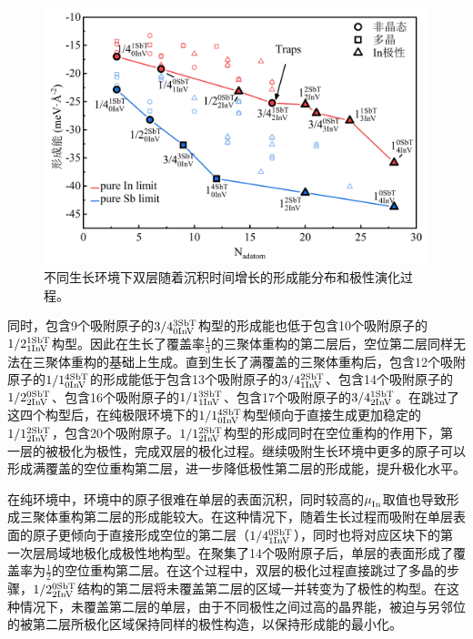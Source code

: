 \begin{figure}[htb]
    \includegraphics{pic/IS_DFT_2LInSb_partEnergy.png}
    \caption{不同生长环境下双层随着沉积时间增长的形成能分布和极性演化过程。}
    \label{fig:IS_DFT_2LInSb_partEnergy}
\end{figure}

同时，包含9个吸附原子的$\rm 3/4{}_{0InV}^{3SbT} \it$构型的形成能也低于包含10个吸附原子的$\rm 1/2{}_{1InV}^{1SbT} \it$构型。因此在生长了覆盖率$\frac{1}{3}$的三聚体重构的第二层后，空位第二层同样无法在三聚体重构的基础上生成。直到生长了满覆盖的三聚体重构后，包含12个吸附原子的$\rm 1/1{}_{0InV}^{4SbT} \it$的形成能低于包含13个吸附原子的$\rm 3/4{}_{1InV}^{2SbT} \it$、包含14个吸附原子的$\rm 1/2{}_{2InV}^{0SbT} \it$、包含16个吸附原子的$\rm 1/1{}_{1InV}^{3SbT} \it$、包含17个吸附原子的$\rm 3/4{}_{2InV}^{1SbT} \it$。在跳过了这四个构型后，在纯极限环境下的$\rm 1/1{}_{0InV}^{4SbT} \it$构型倾向于直接生成更加稳定的$\rm 1/1{}_{2InV}^{2SbT} \it$，包含20个吸附原子。$\rm 1/1{}_{2InV}^{2SbT} \it$构型的形成同时在空位重构的作用下，第一层的被极化为极性，完成双层的极化过程。继续吸附生长环境中更多的原子可以形成满覆盖的空位重构第二层，进一步降低极性第二层的形成能，提升极化水平。

在纯环境中，环境中的原子很难在单层的表面沉积，同时较高的$\it \mu_{\rm In}^{\rm } \it$取值也导致形成三聚体重构第二层的形成能较大。在这种情况下，随着生长过程而吸附在单层表面的原子更倾向于直接形成空位的第二层（$\rm 1/4{}_{1InV}^{0SbT} \it$），同时也将对应区块下的第一次层局域地极化成极性地构型。在聚集了14个吸附原子后，单层的表面形成了覆盖率为$\frac{1}{2}$的空位重构第二层。在这个过程中，双层的极化过程直接跳过了多晶的步骤，$\rm 1/2{}_{2InV}^{0SbT} \it$结构的第二层将未覆盖第二层的区域一并转变为了极性的构型。在这种情况下，未覆盖第二层的单层，由于不同极性之间过高的晶界能，被迫与另邻位的被第二层所极化区域保持同样的极性构造，以保持形成能的最小化。


